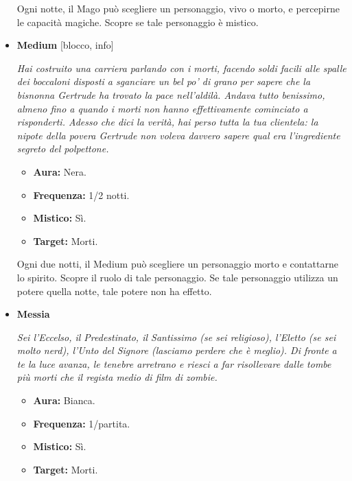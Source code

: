 \documentclass[a4paper,10pt]{article}
\begin{document}
\begin{itemize}
            Ogni notte, il Mago può scegliere un personaggio, vivo o morto, e percepirne le capacità magiche. Scopre se tale personaggio è mistico.

      \item \textbf{Medium} [blocco, info]

            \emph{Hai costruito una carriera parlando con i morti, facendo soldi facili alle spalle dei boccaloni disposti a sganciare un bel po' di grano per sapere che la bisnonna Gertrude ha trovato la pace nell'aldilà. Andava tutto benissimo, almeno fino a quando i morti non hanno effettivamente cominciato a risponderti. Adesso che dici la verità, hai perso tutta la tua clientela: la nipote della povera Gertrude non voleva davvero sapere qual era l'ingrediente segreto del polpettone.}

            \begin{multicols}{2}
                  \begin{itemize}
                        \item \textbf{Aura:} Nera.
                        \item \textbf{Frequenza:} 1/2 notti.
                        \item \textbf{Mistico:} Sì.
                        \item \textbf{Target:} Morti.
                  \end{itemize}
            \end{multicols}

            Ogni due notti, il Medium può scegliere un personaggio morto e contattarne lo spirito. Scopre il ruolo di tale personaggio. Se tale personaggio utilizza un potere quella notte, tale potere non ha effetto.

      \item \textbf{Messia}

            \emph{Sei l'Eccelso, il Predestinato, il Santissimo (se sei religioso), l'Eletto (se sei molto nerd), l'Unto del Signore (lasciamo perdere che è meglio). Di fronte a te la luce avanza, le tenebre arretrano e riesci a far risollevare dalle tombe più morti che il regista medio di film di zombie.}

            \begin{multicols}{2}
                  \begin{itemize}
                        \item \textbf{Aura:} Bianca.
                        \item \textbf{Frequenza:} 1/partita.
                        \item \textbf{Mistico:} Sì.
                        \item \textbf{Target:} Morti.
                  \end{itemize}
            \end{multicols}


\end{itemize}
\end{document}
